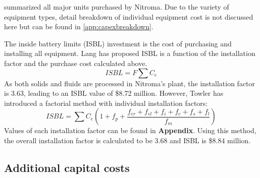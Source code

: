  summarized all major units purchased by Nitroma. Due to the variety of equipment types, detail breakdown of individual equipment cost is not discussed here but can be found in \cref{app:capexbreakdown}.

The inside battery limits (ISBL) investment is the cost of purchasing and installing all equipment. Lang has proposed ISBL is a function of the installation factor and the purchase cost calculated above.
\begin{equation}
    ISBL=F\sum C_{e}    
\end{equation}
As both solids and fluids are processed in Nitroma's plant, the installation factor is 3.63, leading to an ISBL value of \$8.72 million. However, Towler \cite{sinnott_chemical_2020} has introduced a factorial method with individual installation factors:
\begin{equation}
    ISBL=\sum C_{e}\left(1+f_{p}+\frac{f_{er}+f_{el}+f_{i}+f_{c}+f_{s}+f_{l}}{f_{m}}\right)
\end{equation}
Values of each installation factor can be found in \textbf{Appendix}. Using this method, the overall installation factor is calculated to be 3.68 and ISBL is \$8.84 million.

\subsection{Additional capital costs}

